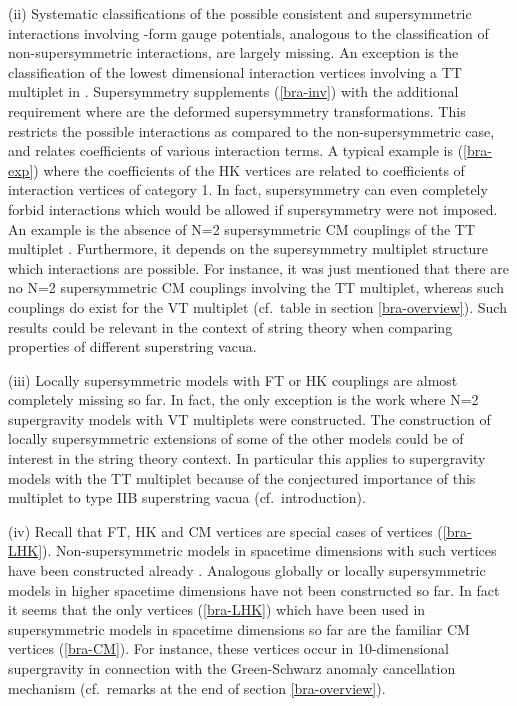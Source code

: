 \documentclass[a4paper,12pt]{article}
\begin{document}
(ii) Systematic classifications of the possible
consistent and supersymmetric interactions involving
\coordHE{}-form gauge potentials, analogous to
the classification \cite{bra-HK1,bra-HK2,bra-HK3}
of non-supersymmetric interactions,
are largely missing.
An exception is the classification of the lowest dimensional
interaction vertices involving a TT multiplet in \cite{bra-13}.
Supersymmetry supplements (\ref{bra-inv}) with the 
additional requirement
\coordHE{} where \coordHE{}
are the deformed supersymmetry transformations.
This restricts the possible
interactions as compared to the non-supersymmetric case, 
and relates coefficients of various interaction terms.
A typical example is (\ref{bra-exp}) where the coefficients of the
HK vertices are related to coefficients of interaction
vertices of category 1.
In fact, supersymmetry can even completely forbid interactions which
would be allowed if supersymmetry were not imposed.
An example is the absence of N=2 supersymmetric
CM couplings of the TT multiplet
\cite{bra-13}. Furthermore, it depends
on the supersymmetry multiplet structure which
interactions are possible. For instance, 
it was just mentioned that there are no N=2 supersymmetric
CM couplings involving the TT multiplet, whereas such couplings
do exist for the VT multiplet (cf.\ table in section \ref{bra-overview}).
Such results could be relevant in the context
of string theory when comparing
properties of different superstring vacua.

(iii) Locally supersymmetric models with FT or HK couplings
are almost completely missing so far. In fact, the only
exception is the work \cite{bra-7} where N=2 supergravity
models with VT multiplets were constructed.
The construction of locally supersymmetric extensions
of some of the other models could be of interest 
in the string theory context. In particular this
applies to supergravity models with the TT multiplet because of
the conjectured importance of this multiplet to
type IIB superstring vacua (cf.\ introduction).

(iv) Recall that FT, HK and CM vertices are special
cases of vertices (\ref{bra-LHK}). Non-supersymmetric
models in spacetime dimensions \coordHE{} with such vertices
have been constructed already \cite{bra-HK1,bra-BST}. Analogous
globally or locally supersymmetric models in
higher spacetime dimensions have not been constructed
so far. In fact it seems that the only vertices  (\ref{bra-LHK}) 
which have been used in supersymmetric models in
spacetime dimensions \coordHE{} so far are the familiar
CM vertices (\ref{bra-CM}). For instance, these vertices
occur in 10-dimensional supergravity in connection with
the Green-Schwarz anomaly cancellation mechanism
(cf.\ remarks at the end of section \ref{bra-overview}).
\newpage
\end{document}
